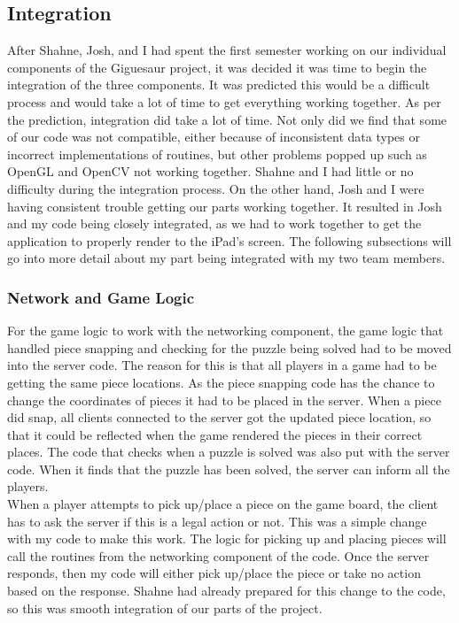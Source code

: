 \documentclass{article}
\begin{document}
\subsection{Integration}
After Shahne, Josh, and I had spent the first semester working on our individual
components of the Giguesaur project, it was decided it was time to begin the
integration of the three components. It was predicted this would be a difficult
process and would take a lot of time to get everything working together. As per
the prediction, integration did take a lot of time. Not only did we find that
some of our code was not compatible, either because of inconsistent data types
or incorrect implementations of routines, but other problems popped up such as
OpenGL and \gls{OpenCV} not working together. Shahne and I had little or no
difficulty during the integration process. On the other hand, Josh and I were
having consistent trouble getting our parts working together. It resulted in
Josh and my code being closely integrated, as we had to work together to get the
application to properly render to the iPad's screen. The following subsections
will go into more detail about my part being integrated with my two team
members.

\subsubsection{Network and Game Logic}
For the game logic to work with the networking component, the game logic that
handled piece snapping and checking for the puzzle being solved had to be moved
into the server code. The reason for this is that all players in a game had to
be getting the same piece locations. As the piece snapping code has the chance
to change the coordinates of pieces it had to be placed in the server. When a
piece did snap, all clients connected to the server got the updated piece
location, so that it could be reflected when the game rendered the pieces in
their correct places. The code that checks when a puzzle is solved was also put
with the server code. When it finds that the puzzle has been solved, the server
can inform all the players.\\

When a player attempts to pick up/place a piece on the game board, the client
has to ask the server if this is a legal action or not. This was a simple change
with my code to make this work. The logic for picking up and placing pieces will
call the routines from the networking component of the code. Once the server
responds, then my code will either pick up/place the piece or take no action
based on the response. Shahne had already prepared for this change to the code,
so this was smooth integration of our parts of the project.\\
\end{document}
